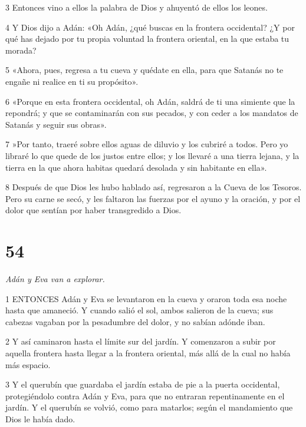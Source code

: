 \par 3 Entonces vino a ellos la palabra de Dios y ahuyentó de ellos los leones.

\par 4 Y Dios dijo a Adán: «Oh Adán, ¿qué buscas en la frontera occidental? ¿Y por qué has dejado por tu propia voluntad la frontera oriental, en la que estaba tu morada?

\par 5 «Ahora, pues, regresa a tu cueva y quédate en ella, para que Satanás no te engañe ni realice en ti su propósito».

\par 6 «Porque en esta frontera occidental, oh Adán, saldrá de ti una simiente que la repondrá; y que se contaminarán con sus pecados, y con ceder a los mandatos de Satanás y seguir sus obras».

\par 7 »Por tanto, traeré sobre ellos aguas de diluvio y los cubriré a todos. Pero yo libraré lo que quede de los justos entre ellos; y los llevaré a una tierra lejana, y la tierra en la que ahora habitas quedará desolada y sin habitante en ella».

\par 8 Después de que Dios les hubo hablado así, regresaron a la Cueva de los Tesoros. Pero su carne se secó, y les faltaron las fuerzas por el ayuno y la oración, y por el dolor que sentían por haber transgredido a Dios.

\chapter{54}

\par \textit{Adán y Eva van a explorar.}

\par 1 ENTONCES Adán y Eva se levantaron en la cueva y oraron toda esa noche hasta que amaneció. Y cuando salió el sol, ambos salieron de la cueva; sus cabezas vagaban por la pesadumbre del dolor, y no sabían adónde iban.

\par 2 Y así caminaron hasta el límite sur del jardín. Y comenzaron a subir por aquella frontera hasta llegar a la frontera oriental, más allá de la cual no había más espacio.

\par 3 Y el querubín que guardaba el jardín estaba de pie a la puerta occidental, protegiéndolo contra Adán y Eva, para que no entraran repentinamente en el jardín. Y el querubín se volvió, como para matarlos; según el mandamiento que Dios le había dado.

